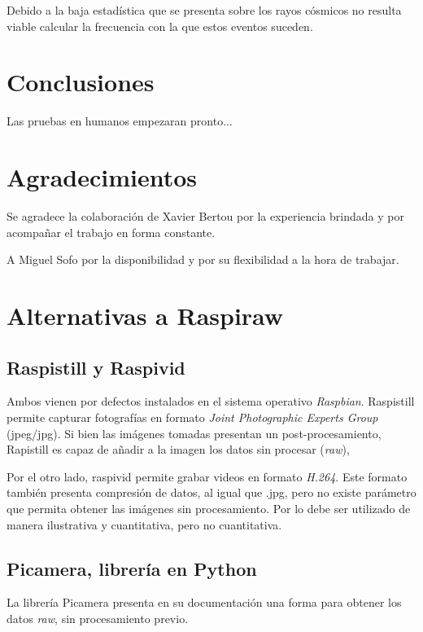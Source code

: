 \documentclass[twoside,twocolumn]{article}
\begin{document}
      Debido a la baja estadística que se presenta sobre los rayos cósmicos no resulta viable calcular la frecuencia
      con la que estos eventos suceden.
      

  \section{Conclusiones}
    Las pruebas en humanos empezaran pronto...

  
  

  \section*{Agradecimientos}
    Se agradece la colaboración de Xavier Bertou por la experiencia brindada y por
    acompañar el trabajo en forma constante.

    A Miguel Sofo por la disponibilidad y por su flexibilidad a la hora de trabajar.
   
  \clearpage
  \appendix
  \section{Alternativas a Raspiraw}\label{sec:ap_alternatives}
  
  \subsection{Raspistill y Raspivid}
    Ambos vienen por defectos instalados en el sistema operativo \emph{Raspbian}.
    Raspistill permite capturar fotografías en formato \emph{Joint Photographic Experts Group} (jpeg/jpg).
    Si bien las imágenes tomadas presentan un post-procesamiento, Rapistill es capaz de añadir a la imagen los datos sin procesar (\emph{raw}),

    Por el otro lado, raspivid permite grabar videos en formato \emph{H.264}.
    Este formato también presenta compresión de datos, al igual que .jpg, pero no existe parámetro que permita obtener las imágenes sin procesamiento.
    Por lo debe ser utilizado de manera ilustrativa y cuantitativa, pero no cuantitativa.

  \subsection{Picamera, librería en Python}
    La librería Picamera presenta en su documentación una forma para obtener los datos \emph{raw}, sin procesamiento previo.
\end{document}
